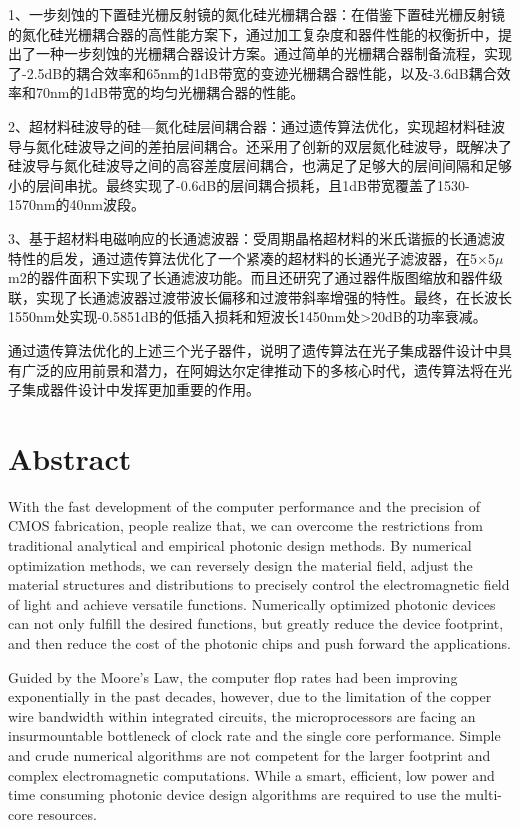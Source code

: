 1、一步刻蚀的下置硅光栅反射镜的氮化硅光栅耦合器：在借鉴下置硅光栅反射镜的氮化硅光栅耦合器的高性能方案下，通过加工复杂度和器件性能的权衡折中，提出了一种一步刻蚀的光栅耦合器设计方案。通过简单的光栅耦合器制备流程，实现了-2.5dB的耦合效率和65nm的1dB带宽的变迹光栅耦合器性能，以及-3.6dB耦合效率和70nm的1dB带宽的均匀光栅耦合器的性能。

2、超材料硅波导的硅—氮化硅层间耦合器：通过遗传算法优化，实现超材料硅波导与氮化硅波导之间的差拍层间耦合。还采用了创新的双层氮化硅波导，既解决了硅波导与氮化硅波导之间的高容差度层间耦合，也满足了足够大的层间间隔和足够小的层间串扰。最终实现了-0.6dB的层间耦合损耗，且1dB带宽覆盖了1530-1570nm的40nm波段。

3、基于超材料电磁响应的长通滤波器：受周期晶格超材料的米氏谐振的长通滤波特性的启发，通过遗传算法优化了一个紧凑的超材料的长通光子滤波器，在5×5$\mu$m2的器件面积下实现了长通滤波功能。而且还研究了通过器件版图缩放和器件级联，实现了长通滤波器过渡带波长偏移和过渡带斜率增强的特性。最终，在长波长1550nm处实现-0.5851dB的低插入损耗和短波长1450nm处>20dB的功率衰减。

通过遗传算法优化的上述三个光子器件，说明了遗传算法在光子集成器件设计中具有广泛的应用前景和潜力，在阿姆达尔定律推动下的多核心时代，遗传算法将在光子集成器件设计中发挥更加重要的作用。


\intobmk\chapter*{Abstract}%

With the fast development of the computer performance and the precision of CMOS fabrication, people realize that, we can overcome the restrictions from traditional analytical and empirical photonic design methods. By numerical optimization methods, we can reversely design the material field, adjust the material structures and distributions to precisely control the electromagnetic field of light and achieve versatile functions. Numerically optimized photonic devices can not only fulfill the desired functions, but greatly reduce the device footprint, and then reduce the cost of the photonic chips and push forward the applications.

Guided by the Moore's Law, the computer flop rates had been improving exponentially in the past decades, however, due to the limitation of the copper wire bandwidth within integrated circuits, the microprocessors are facing an insurmountable bottleneck of clock rate and the single core performance. Simple and crude numerical algorithms are not competent for the larger footprint and complex electromagnetic computations. While a smart, efficient, low power and time consuming photonic device design algorithms are required to use the multi-core resources.

